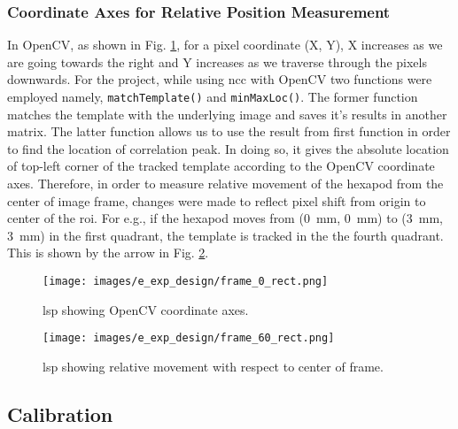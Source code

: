     \subsubsection*{Coordinate Axes for Relative Position Measurement}
        In OpenCV, as shown in Fig. \ref{fig:frame_0_rect.png}, for a pixel coordinate (X, Y), X increases as we are going towards the right and Y increases as we traverse through the pixels downwards. For the project, while using \gls{ncc} with OpenCV two functions were employed namely, \texttt{matchTemplate()} and \texttt{minMaxLoc()}. The former function matches the template with the underlying image and saves it's results in another matrix. The latter function allows us to use the result from first function in order to find the location of correlation peak. In doing so, it gives the absolute location of top-left corner of the tracked template according to the OpenCV coordinate axes. Therefore, in order to measure relative movement of the hexapod from the center of image frame, changes were made to reflect pixel shift from origin to center of the \gls{roi}. For e.g., if the hexapod moves from (\SI{0}{\milli\meter}, \SI{0}{\milli\meter}) to (\SI{3}{\milli\meter}, \SI{3}{\milli\meter}) in the first quadrant, the template is tracked in the the fourth quadrant. This is shown by the arrow in Fig. \ref{fig:frame_60_rect.png}. 

        \begin{figure}[h]
            \centering
            \texttt{[image: images/e\_exp\_design/frame\_0\_rect.png]}
            \caption{\gls{lsp} showing OpenCV coordinate axes.}
            \label{fig:frame_0_rect.png}
        \end{figure}
        
        \begin{figure}[h]
            \centering
            \texttt{[image: images/e\_exp\_design/frame\_60\_rect.png]}
            \caption{\gls{lsp} showing relative movement with respect to center of frame.}
            \label{fig:frame_60_rect.png}
        \end{figure}

\clearpage

\vspace{5mm}

\subsection{Calibration}\label{section:calibration}
